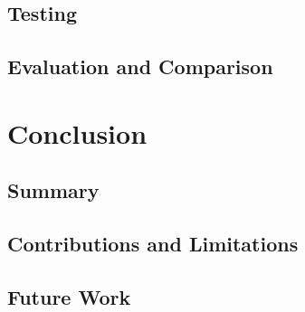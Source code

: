 \documentclass[12pt,a4paper]{article}
\begin{document}
\subsection{Testing}


\subsection{Evaluation and Comparison}





%
%
%
%
%
%
%
%
\newpage
\section{Conclusion} \label{section:conclusion}


\subsection{Summary}


\subsection{Contributions and Limitations}


\subsection{Future Work}
\end{document}
